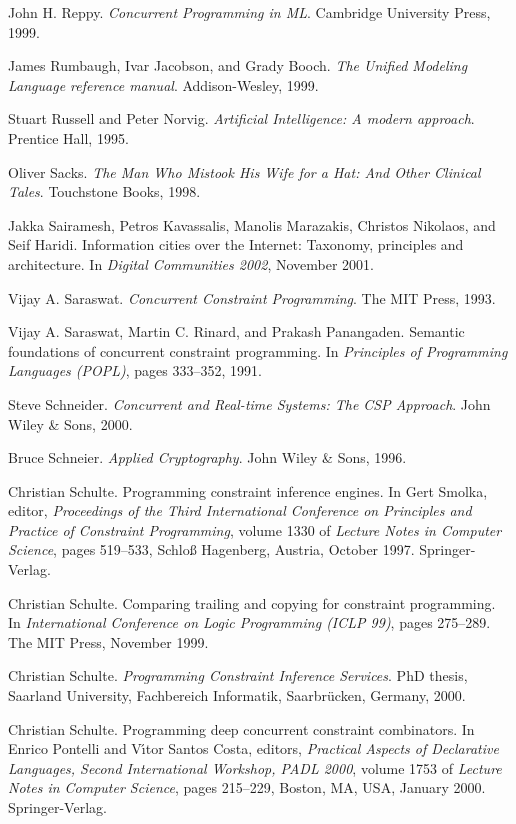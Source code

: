 \begin{thebibliography}{213}
John H. Reppy. \emph{Concurrent Programming in ML}. Cambridge University Press, 1999.

James Rumbaugh, Ivar Jacobson, and Grady Booch. \emph{The Unified Modeling Language reference manual}. Addison-Wesley, 1999.

Stuart Russell and Peter Norvig. \emph{Artificial Intelligence: A modern approach}. Prentice Hall, 1995.

Oliver Sacks. \emph{The Man Who Mistook His Wife for a Hat: And Other Clinical Tales}. Touchstone Books, 1998.

Jakka Sairamesh, Petros Kavassalis, Manolis Marazakis, Christos Nikolaos, and Seif Haridi. Information cities over the Internet: Taxonomy, principles and architecture. In \emph{Digital Communities 2002}, November 2001.

Vijay A. Saraswat. \emph{Concurrent Constraint Programming}. The MIT Press, 1993.

Vijay A. Saraswat, Martin C. Rinard, and Prakash Panangaden. Semantic foundations of concurrent constraint programming. In \emph{Principles of Programming Languages (POPL)}, pages 333–352, 1991.

Steve Schneider. \emph{Concurrent and Real-time Systems: The CSP Approach}. John Wiley \& Sons, 2000.

Bruce Schneier. \emph{Applied Cryptography}. John Wiley \& Sons, 1996.

Christian Schulte. Programming constraint inference engines. In Gert Smolka, editor, \emph{Proceedings of the Third International Conference on Principles and Practice of Constraint Programming}, volume 1330 of \emph{Lecture Notes in Computer Science}, pages 519–533, Schloß Hagenberg, Austria, October 1997. Springer-Verlag.

Christian Schulte. Comparing trailing and copying for constraint programming. In \emph{International Conference on Logic Programming (ICLP 99)}, pages 275–289. The MIT Press, November 1999.

Christian Schulte. \emph{Programming Constraint Inference Services}. PhD thesis, Saarland University, Fachbereich Informatik, Saarbr\"ucken, Germany, 2000.

Christian Schulte. Programming deep concurrent constraint combinators. In Enrico Pontelli and V\'\i tor Santos Costa, editors, \emph{Practical Aspects of Declarative Languages, Second International Workshop, PADL 2000}, volume 1753 of \emph{Lecture Notes in Computer Science}, pages 215–229, Boston, MA, USA, January 2000. Springer-Verlag.


\end{thebibliography}

